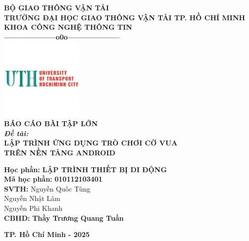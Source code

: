 \documentclass[a4paper,12pt]{article}
\begin{document}
\begin{center}
    \textbf{BỘ GIAO THÔNG VẬN TẢI}\\
    \textbf{TRƯỜNG ĐẠI HỌC GIAO THÔNG VẬN TẢI TP. HỒ CHÍ MINH}\\
    \textbf{KHOA CÔNG NGHỆ THÔNG TIN}\\
    \textbf{--------------------o0o--------------------}\\[1.5cm]

    \includegraphics[width=0.3\textwidth]{img/logo_uth.png}\\[1.5cm]

    \textbf{\LARGE BÁO CÁO BÀI TẬP LỚN}\\[1cm]

    \textbf{\large \textit{Đề tài:}}\\[0.5cm]
    \textbf{\Large LẬP TRÌNH ỨNG DỤNG TRÒ CHƠI CỜ VUA}\\[0.2cm]
    \textbf{\Large TRÊN NỀN TẢNG ANDROID}\\[1cm]

    \begin{flushleft}
        \textbf{\large Học phần:} \textbf{LẬP TRÌNH THIẾT BỊ DI ĐỘNG}\\[0.5cm]
        \textbf{\large Mã học phần:} \textbf{010112103401}\\[1cm]

        \hspace{5cm}\textbf{\large SVTH:}
        \hspace{0cm} Nguyễn Quốc Tùng\\
        \hspace{6.9cm} Nguyễn Nhật Lâm\\
        \hspace{6.9cm} Nguyễn Phi Khanh\\[1cm]

        \hspace{5cm}\textbf{\large CBHD:} \textbf{Thầy Trương Quang Tuấn}\\[2cm]
    \end{flushleft}

    \textbf{TP. Hồ Chí Minh - 2025}
\end{center}
\end{document}
